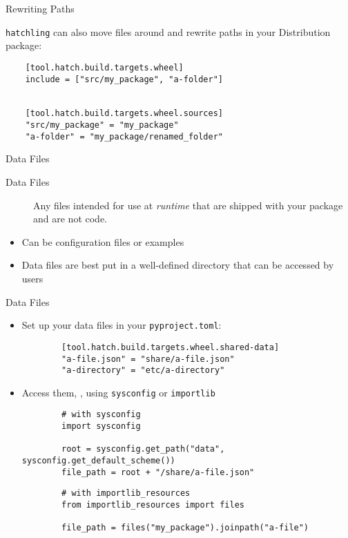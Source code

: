 {
\begin{frame}[fragile]{Rewriting Paths}
  \begin{center}
    \Large\textcolor{ccyan}{\texttt{hatchling} can also move files around and rewrite paths in your Distribution package:}
  \end{center}
  \begin{verbatim}
    [tool.hatch.build.targets.wheel]
    include = ["src/my_package", "a-folder"]


    [tool.hatch.build.targets.wheel.sources]
    "src/my_package" = "my_package"
    "a-folder" = "my_package/renamed_folder"
  \end{verbatim}
\end{frame}
}

\begin{frame}{Data Files}
  \begin{description}
    \item [Data Files] Any files intended for use at \emph{runtime} that are shipped with your package
    and are not code.
  \end{description}

  \begin{itemize}
    \setlength{\itemsep}{1em}
    \item [\to] Can be configuration files or examples
    \item [\to] Data files are best put in a well-defined directory that can be accessed by users
  \end{itemize}
\end{frame}

\begin{darkframe}{Data Files}
  \begin{itemize}
    \item Set up your data files in your \texttt{pyproject.toml}:
      \begin{verbatim}
        [tool.hatch.build.targets.wheel.shared-data]
        "a-file.json" = "share/a-file.json"
        "a-directory" = "etc/a-directory"
      \end{verbatim}
    \item Access them, \eg, using \texttt{sysconfig} or \texttt{importlib}
      \begin{verbatim}
        # with sysconfig
        import sysconfig

        root = sysconfig.get_path("data", sysconfig.get_default_scheme())
        file_path = root + "/share/a-file.json"
      \end{verbatim}
      \vspace{1.5em}
      
      \begin{verbatim}
        # with importlib_resources
        from importlib_resources import files

        file_path = files("my_package").joinpath("a-file")
      \end{verbatim}
  \end{itemize}
\end{darkframe}

